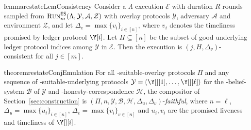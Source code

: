 \begin{restatable}[Consistency]{lemma}{restateLemConsistency}\label{lem:consistency}
  Consider a \rollerblade $\Lambda$ execution $\mathcal{E}$ with duration $R$ rounds
  sampled from $\textsc{Run}^{\textsf{ES}}_m(\Lambda, \mathcal{Y}, \mathcal{A}, \mathcal{Z})$
  with overlay protocols $\mathcal{Y}$, adversary $\mathcal{A}$ and environment $\mathcal{Z}$,
  and let $\Delta_v = \max\{v_i\}_{i \in [n]}$,
  where $v_i$ denotes the timeliness
  promised by ledger protocol $\Y[i]$.
  Let $H \subseteq [n]$ be the subset of good underlying ledger protocol indices among $\mathcal{Y}$
  in $\mathcal{E}$.
  Then the execution is $(j, H, \Delta_v)$-consistent for all $j \in [m]$.
\end{restatable}


\begin{restatable}[Emulation]{theorem}{restateConjEmulation}\label{conj:emulation}
  For all \rollerblade-suitable-overlay protocols $\Pi$
  and any sequence of \rollerblade-suitable-underlying
  protocols $\mathcal{Y} = (\Y[][1], \ldots, \Y[][\ell])$
  for the \rollerblade-belief-system $\mathcal{B}$ of $\mathcal{Y}$
  and \rollerblade-honesty-correspondence $\mathcal{H}$,
  the compositor \rollerblade of Section~\ref{sec:construction} is
  $(\Pi, n, \mathcal{Y}, \mathcal{B}, \mathcal{H}, \Delta_u, \Delta_v)$-\emph{faithful},
  where $n = \ell$, $\Delta_u = \max\{u_i\}_{i \in [n]}$,
  $\Delta_v = \max\{v_i\}_{v \in [n]}$
  and $u_i, v_i$ are the promised liveness and timeliness of $\Y[][i]$.
\end{restatable}


